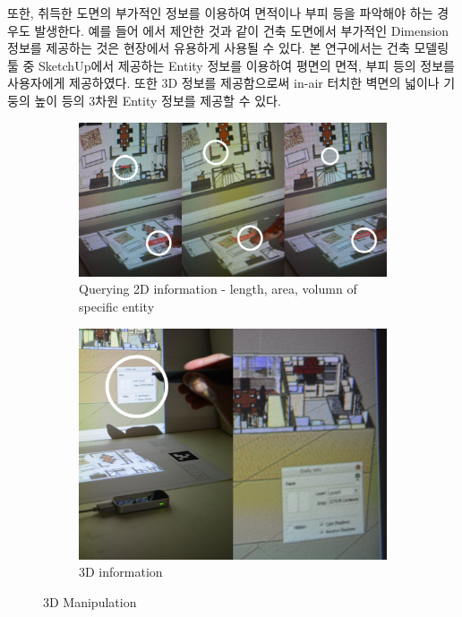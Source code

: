 또한, 취득한 도면의 부가적인 정보를 이용하여 면적이나 부피 등을 파악해야 하는 경우도 발생한다. 예를 들어 \cite{song_penlight:_2009}에서 제안한 것과 같이 건축 도면에서 부가적인 Dimension 정보를 제공하는 것은 현장에서 유용하게 사용될 수 있다. 본 연구에서는 건축 모델링툴 중 SketchUp에서 제공하는 Entity 정보를 이용하여 평면의 면적, 부피 등의 정보를 사용자에게 제공하였다. 또한 3D 정보를 제공함으로써 in-air 터치한 벽면의 넓이나 기둥의 높이 등의 3차원 Entity 정보를 제공할 수 있다. 
\begin{figure}[!ht]
	\centering
        \begin{subfigure}[b]{0.55\textwidth}
	        \centering
                \includegraphics[width=\textwidth]{4-Interaction_Design/2d_info}
                \caption{Querying 2D information - length, area, volumn of specific entity}
                \label{fig:2d_info}
        \end{subfigure}%
        \hfill
        \begin{subfigure}[b]{0.37\textwidth}
            \centering
            \includegraphics[width=\textwidth]{4-Interaction_Design/3d_info}
                \caption{3D information}
                \label{fig:3d_info}
        \end{subfigure}
	\caption{3D Manipulation}
    \label{fig:infor}
\end{figure}


